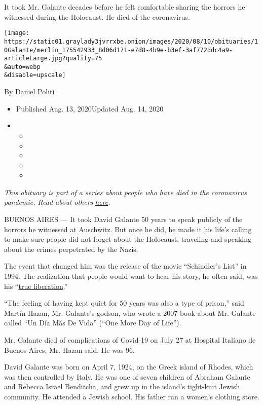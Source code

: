 It took Mr. Galante decades before he felt comfortable sharing the
horrors he witnessed during the Holocaust. He died of the coronavirus.

\texttt{[image: https://static01.graylady3jvrrxbe.onion/images/2020/08/10/obituaries/10Galante/merlin\_175542933\_8d06d171-e7d8-4b9e-b3ef-3af772ddc4a9-articleLarge.jpg?quality=75\\\&auto=webp\\\&disable=upscale]}

By Daniel Politi

\begin{itemize}
\item
  Published Aug. 13, 2020Updated Aug. 14, 2020
\item
  \begin{itemize}
  \item
  \item
  \item
  \item
  \item
  \end{itemize}
\end{itemize}

\emph{This obituary is part of a series about people who have died in
the coronavirus pandemic. Read about others}
\href{https://www.nytimes3xbfgragh.onion/interactive/2020/obituaries/people-died-coronavirus-obituaries.html}{\emph{here}}\emph{.}

BUENOS AIRES --- It took David Galante 50 years to speak publicly of the
horrors he witnessed at Auschwitz. But once he did, he made it his
life's calling to make sure people did not forget about the Holocaust,
traveling and speaking about the crimes perpetrated by the Nazis.

The event that changed him was the release of the movie ``Schindler's
List'' in 1994. The realization that people would want to hear his
story, he often said, was his
``\href{https://www.conclusion.com.ar/sin-categoria/sobrevivi-a-auschwitz-para-contar-lo-que-paso-alli-y-evitar-que-se-repita/01/2017/}{true
liberation}.''

``The feeling of having kept quiet for 50 years was also a type of
prison,'' said Martín Hazan, Mr. Galante's godson, who wrote a 2007 book
about Mr. Galante called ``Un Día Más De Vida'' (``One More Day of
Life'').

Mr. Galante died of complications of Covid-19 on July 27 at Hospital
Italiano de Buenos Aires, Mr. Hazan said. He was 96.

David Galante was born on April 7, 1924, on the Greek island of Rhodes,
which was then controlled by Italy. He was one of seven children of
Abraham Galante and Rebecca Israel Benditcha, and grew up in the
island's tight-knit Jewish community. He attended a Jewish school. His
father ran a women's clothing store.

